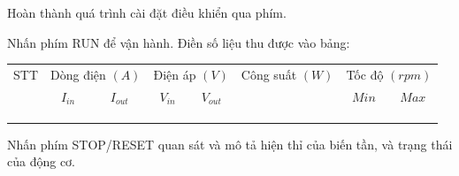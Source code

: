 \documentclass[13pt,a4paper]{extarticle}
\begin{document}
\begin{list}{--}{}
Hoàn thành quá trình cài đặt điều khiển qua phím.
\item Nhấn phím RUN để vận hành. Điền số liệu thu được vào bảng:
\begin{longtable}{|c|c|c|c|c|c|c|c|}\hline
STT & \multicolumn{2}{|c|}{Dòng điện $(A)$} & \multicolumn{2}{|c|}{Điện áp $(V)$} & Công suất $(W)$ & \multicolumn{2}{|c|}{Tốc độ $(rpm)$} \\ \cline{2-5} \cline{7-8}
& $I_{in}$ & $I_{out}$ & $V_{in}$ & $V_{out}$  & & $Min$ & $Max$ \\ \hline
&  &  &  &   & &  &  \\ \hline
&  &  &  &   & &  &  \\ \hline
&  &  &  &   & &  &  \\ \hline
\end{longtable}
\item Nhấn phím STOP/RESET quan sát và mô tả hiện thỉ của biến tần, và trạng thái của động cơ.
\end{list}
\end{document}
